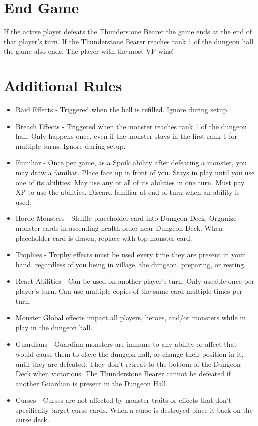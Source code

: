 \documentclass[12pt]{article}
\newenvironment{itemizeCustom}
{\begin{itemize}
  \setlength{\itemsep}{1pt}
  \setlength{\parskip}{0pt}
  \setlength{\parsep}{0pt}}
{\end{itemize}}
\begin{document}
\begin{multicols*}{2}
\section*{End Game}
If the active player defeats the Thunderstone Bearer the game ends at the end of that player's turn. If the Thunderstone Bearer reaches rank 1 of the dungeon hall the game also ends. The player with the most VP wins!

\newpage
\section*{Additional Rules}
\begin{itemizeCustom}
	\item Raid Effects - Triggered when the hall is refilled. Ignore during setup.
	\item Breach Effects - Triggered when the monster reaches rank 1 of the dungeon hall. Only happens once, even if the monster stays in the first rank 1 for multiple turns. Ignore during setup.
	\item Familiar - Once per game, as a Spoils ability after defeating a monster, you may draw a familiar. Place face up in front of you. Stays in play until you use one of its abilities. May use any or all of its abilities in one turn. Must pay XP to use the abilities. Discard familiar at end of turn when an ability is used.
	\item Horde Monsters - Shuffle placeholder card into Dungeon Deck. Organize monster cards in ascending health order near Dungeon Deck. When placeholder card is drawn, replace with top monster card.
	\item Trophies - Trophy effects must be used every time they are present in your hand, regardless of you being in village, the dungeon, preparing, or resting.
	\item React Abilities - Can be used on another player's turn. Only useable once per player's turn. Can use multiple copies of the same card multiple times per turn.
	\item Monster Global effects impact all players, heroes, and/or monsters while in play in the dungeon hall.
	\item Guardians - Guardian monsters are immune to any ability or affect that would cause them to elave the dungeon hall, or change their position in it, until they are defeated. They don't retreat to the bottom of the Dungeon Deck when victorious. The Thunderstone Bearer cannot be defeated if another Guardian is present in the Dungeon Hall.
	\item Curses - Curses are not affected by monster traits or effects that don't specifically target curse cards. When a curse is destroyed place it back on the curse deck.
\end{itemizeCustom}

\end{multicols*}
\end{document}
